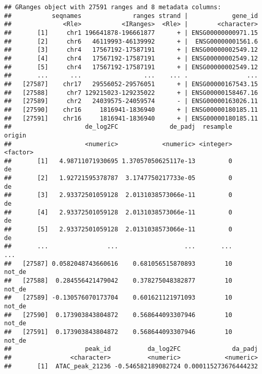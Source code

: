 \documentclass[
]{article}
\newenvironment{Shaded}{}{}
\newcommand{\KeywordTok}[1]{\textcolor[rgb]{0.00,0.44,0.13}{\textbf{#1}}}
\newcommand{\NormalTok}[1]{#1}
\newcommand{\OperatorTok}[1]{\textcolor[rgb]{0.40,0.40,0.40}{#1}}
\newcommand{\StringTok}[1]{\textcolor[rgb]{0.25,0.44,0.63}{#1}}
\begin{document}
\begin{Shaded}
\end{Shaded}

\begin{verbatim}
## GRanges object with 27591 ranges and 8 metadata columns:
##           seqnames              ranges strand |            gene_id
##              <Rle>           <IRanges>  <Rle> |        <character>
##       [1]     chr1 196641878-196661877      + | ENSG00000000971.15
##       [2]     chr6   46119993-46139992      + |  ENSG00000001561.6
##       [3]     chr4   17567192-17587191      + | ENSG00000002549.12
##       [4]     chr4   17567192-17587191      + | ENSG00000002549.12
##       [5]     chr4   17567192-17587191      + | ENSG00000002549.12
##       ...      ...                 ...    ... .                ...
##   [27587]    chr17   29556052-29576051      + | ENSG00000167543.15
##   [27588]     chr7 129215023-129235022      + | ENSG00000158467.16
##   [27589]     chr2   24039575-24059574      - | ENSG00000163026.11
##   [27590]    chr16     1816941-1836940      + | ENSG00000180185.11
##   [27591]    chr16     1816941-1836940      + | ENSG00000180185.11
##                    de_log2FC              de_padj  resample   origin
##                    <numeric>            <numeric> <integer> <factor>
##       [1]   4.98711071930695 1.37057050625117e-13         0       de
##       [2]   1.92721595378787  3.1747750217733e-05         0       de
##       [3]   2.93372501059128  2.0131038573066e-11         0       de
##       [4]   2.93372501059128  2.0131038573066e-11         0       de
##       [5]   2.93372501059128  2.0131038573066e-11         0       de
##       ...                ...                  ...       ...      ...
##   [27587] 0.0582048743660616    0.681056515870893        10   not_de
##   [27588]  0.284556421479042    0.378275048382877        10   not_de
##   [27589] -0.130576070173704    0.601621121971093        10   not_de
##   [27590]  0.173903843804872    0.568644093307946        10   not_de
##   [27591]  0.173903843804872    0.568644093307946        10   not_de
##                    peak_id          da_log2FC              da_padj
##                <character>          <numeric>            <numeric>
##       [1]  ATAC_peak_21236 -0.546582189082724 0.000115273676444232

\end{verbatim}
\end{document}
